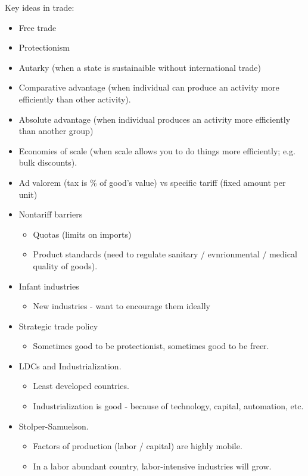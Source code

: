 \documentclass{article}
\begin{document}
Key ideas in trade:
\begin{itemize}
  \item Free trade
  \item Protectionism
  \item Autarky (when a state is sustainaible without international trade)
  \item Comparative advantage (when individual can produce an activity more efficiently than other activity).
  \item Absolute advantage (when individual produces an activity more efficiently than another group)
  \item Economies of scale (when scale allows you to do things more efficiently; e.g. bulk discounts).
  \item Ad valorem (tax is \% of good's value) vs specific tariff (fixed amount per unit)
  \item Nontariff barriers
    \begin{itemize}
      \item Quotas (limits on imports)
      \item Product standards (need to regulate sanitary / evnrionmental / medical quality of goods).
    \end{itemize}
  \item Infant industries
    \begin{itemize}
      \item New industries - want to encourage them ideally
    \end{itemize}
  \item Strategic trade policy
    \begin{itemize}
      \item Sometimes good to be protectionist, sometimes good to be freer.
    \end{itemize}
  \item LDCs and Industrialization.
    \begin{itemize}
      \item Least developed countries.
      \item Industrialization is good - because of technology, capital, automation, etc.
    \end{itemize}
  \item Stolper-Samuelson.
    \begin{itemize}
      \item Factors of production (labor / capital) are highly mobile.
      \item In a labor abundant country, labor-intensive industries will grow.

\end{itemize}
\end{itemize}
\end{document}
